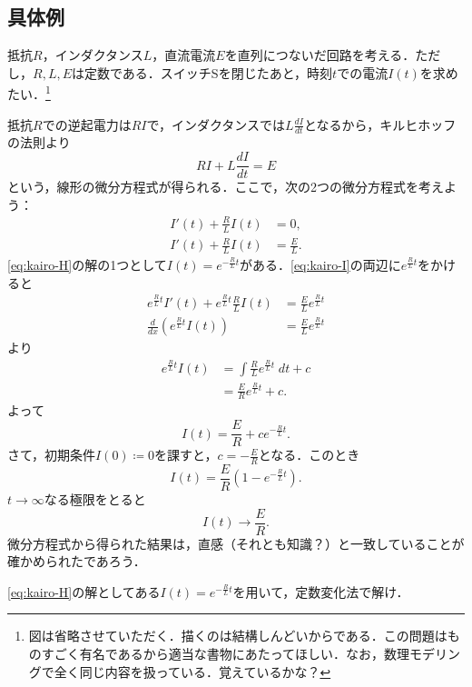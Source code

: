 \subsection{具体例}
\begin{example}
    抵抗$R$，インダクタンス$L$，直流電流$E$を直列につないだ回路を考える．ただし，$R,L,E$は定数である．スイッチSを閉じたあと，時刻$t$での電流$I(t)$を求めたい．\footnote{図は省略させていただく．描くのは結構しんどいからである．この問題はものすごく有名であるから適当な書物にあたってほしい．なお，数理モデリングで全く同じ内容を扱っている．覚えているかな？}

    抵抗$R$での逆起電力は$RI$で，インダクタンスでは$L\frac{dI}{dt}$となるから，キルヒホッフの法則より
    \begin{equation}
        RI+L\frac{dI}{dt} = E
    \end{equation}
    という，線形の微分方程式が得られる．ここで，次の2つの微分方程式を考えよう：
    \begin{align}
        I'(t) + \frac{R}{L}I(t) &= 0, \label{eq:kairo-H} \\
        I'(t) + \frac{R}{L}I(t) &= \frac{E}{L}. \label{eq:kairo-I}
    \end{align}
    \eqref{eq:kairo-H}の解の1つとして$I(t) = e^{-\frac{R}{L}t}$がある．\eqref{eq:kairo-I}の両辺に$e^{\frac{R}{L}t}$をかけると
    \begin{align*}
        e^{\frac{R}{L}t} I'(t) + e^{\frac{R}{L}t} \frac{R}{L} I(t) &= \frac{E}{L} e^{\frac{R}{L}t} \\
        \frac{d}{dx} \left(e^{\frac{R}{L}t} I(t) \right) &= \frac{E}{L} e^{\frac{R}{L}t}
    \end{align*}
    より
    \begin{align*}
        e^{\frac{R}{L}t} I(t) &= \int \frac{R}{L} e^{\frac{R}{L}t} \; dt + c \\
        &= \frac{E}{R} e^{\frac{R}{L}t} + c.
    \end{align*}
    よって
    \[ I(t) = \frac{E}{R} + ce^{-\frac{R}{L}t}.\]
    さて，初期条件$I(0) \coloneqq 0$を課すと，$c=-\frac{E}{R}$となる．このとき
    \[ I(t) = \frac{E}{R}(1 - e^{-\frac{R}{L}t}). \]
    $t \to \infty$なる極限をとると
    \[ I(t) \to \frac{E}{R}. \]
    微分方程式から得られた結果は，直感（それとも知識？）と一致していることが確かめられたであろう．
\end{example}

\begin{homework*}
    \eqref{eq:kairo-H}の解としてある$I(t) = e^{-\frac{R}{L}t}$を用いて，定数変化法で解け．
\end{homework*}

